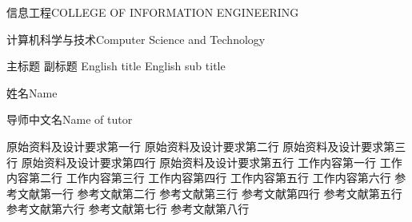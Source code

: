 
\school
{信息工程}{COLLEGE OF INFORMATION ENGINEERING}

\major
{计算机科学与技术}{Computer Science and Technology}

\thesistitle
{主标题}
{副标题}
{English title}
{English sub title}

\thesisauthor
{姓名}{Name}

\teacher
{导师中文名}{Name of tutor}












\assignReq
{原始资料及设计要求第一行}
{原始资料及设计要求第二行}
{原始资料及设计要求第三行}
{原始资料及设计要求第四行}
{原始资料及设计要求第五行}
\assignWork
{工作内容第一行}
{工作内容第二行}
{工作内容第三行}
{工作内容第四行}
{工作内容第五行}
{工作内容第六行}
\assignRef
{参考文献第一行}
{参考文献第二行}
{参考文献第三行}
{参考文献第四行}
{参考文献第五行}
{参考文献第六行}
{参考文献第七行}
{参考文献第八行}